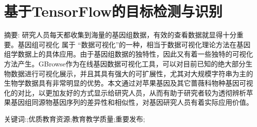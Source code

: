 \chapter*{基于TensorFlow的目标检测与识别}
\vspace{1em}
{\large {\heiti 摘要: }}\normalsize{\songti 
研究人员每天都收集到海量的基因组数据，有效的查看数据就显得十分重要。基因组可视化 属于 “数据可视化”的一种，相当于数据可视化理论方法在基因组学数据上的具体应用。由于基因组数据的独特性，因此又有着一些独特的可视化方法产生。GBrowse作为在线基因数据可视化工具，可以对目前已知的绝大部分生物数据进行可视化展示，并且其具有强大的可扩展性，尤其对大规模字符串为主的生物学数据具有非常明显的优势。本文通过对苹果基因及其它蔷薇科物种基因可视化的对比，以更加友好的方式显示给研究人员，从而有助于研究者较为透彻辨析苹果基因组同源物基因序列的差异性和相似性，对基因研究人员有着实际应用价值。
}

{\large {\heiti 关键词:}}\normalsize{;优质教育资源;教育教学质量;重要发布;}
\thispagestyle{empty}